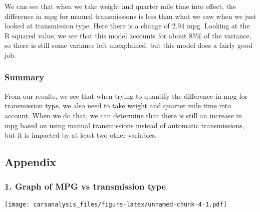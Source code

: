 \documentclass[
]{article}
\newenvironment{Shaded}{\begin{snugshade}}{\end{snugshade}}
\newcommand{\AttributeTok}[1]{\textcolor[rgb]{0.77,0.63,0.00}{#1}}
\newcommand{\FunctionTok}[1]{\textcolor[rgb]{0.00,0.00,0.00}{#1}}
\newcommand{\NormalTok}[1]{#1}
\newcommand{\OtherTok}[1]{\textcolor[rgb]{0.56,0.35,0.01}{#1}}
\newcommand{\SpecialCharTok}[1]{\textcolor[rgb]{0.00,0.00,0.00}{#1}}
\newcommand{\StringTok}[1]{\textcolor[rgb]{0.31,0.60,0.02}{#1}}
\begin{document}
We can see that when we take weight and quarter mile time into effect,
the difference in mpg for manual transmissions is less than what we saw
when we just looked at transmission type. Here there is a change of 2.94
mpg. Looking at the R squared value, we see that this model accounts for
about 85\% of the variance, so there is still some variance left
unexplained, but this model does a fairly good job.

\hypertarget{summary}{%
\subsubsection{Summary}\label{summary}}

From our results, we see that when trying to quantify the difference in
mpg for transmission type, we also need to take weight and quarter mile
time into account. When we do that, we can determine that there is still
an increase in mpg based on using manual transmissions instead of
automatic transmissions, but it is impacted by at least two other
variables.

\hypertarget{appendix}{%
\subsection{Appendix}\label{appendix}}

\hypertarget{graph-of-mpg-vs-transmission-type}{%
\subsubsection{1. Graph of MPG vs transmission
type}\label{graph-of-mpg-vs-transmission-type}}

\begin{Shaded}
\end{Shaded}

\texttt{[image: carsanalysis\_files/figure-latex/unnamed-chunk-4-1.pdf]}
\end{document}
